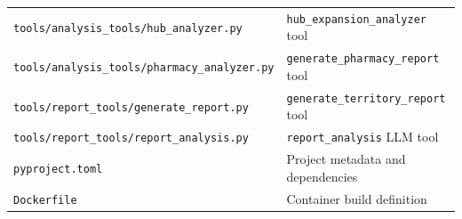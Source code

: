 \documentclass[12pt,a4paper]{report}
\begin{document}
\begin{center}
\begin{longtable}{lp{9cm}}
  \texttt{tools/analysis\_tools/hub\_analyzer.py}      & \texttt{hub\_expansion\_analyzer} tool \\
  \texttt{tools/analysis\_tools/pharmacy\_analyzer.py} & \texttt{generate\_pharmacy\_report} tool \\
  \texttt{tools/report\_tools/generate\_report.py}     & \texttt{generate\_territory\_report} tool \\
  \texttt{tools/report\_tools/report\_analysis.py}     & \texttt{report\_analysis} LLM tool \\
  \texttt{pyproject.toml}                              & Project metadata and dependencies \\
  \texttt{Dockerfile}                                  & Container build definition \\
  \bottomrule
\end{longtable}
\end{center}
\end{document}
